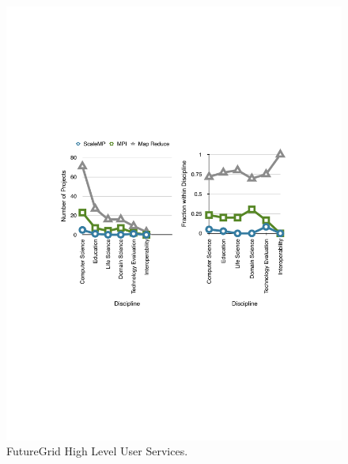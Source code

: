 \documentclass{article}
\begin{document}
\begin{figure}[htb]
  \caption{FutureGrid High Level User Services.}
  \centering
    \includegraphics[width=1.0\textwidth]{images/project-frequency-1.pdf}
\end{figure}
\end{document}
